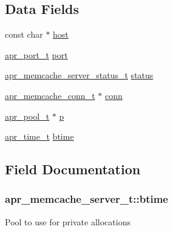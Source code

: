\subsection*{Data Fields}
\begin{DoxyCompactItemize}
\item 
const char $\ast$ \hyperlink{structapr__memcache__server__t_a3f0cbe5cde09d28791f8a8950258b305}{host}
\item 
\hyperlink{group__apr__network__io_gaa670a71960f6eb4fe0d0de2a1e7aba03}{apr\+\_\+port\+\_\+t} \hyperlink{structapr__memcache__server__t_aade2ee234b229b6711a80fe2a3de853b}{port}
\item 
\hyperlink{group__APR__Util__MC_ga3b18c7c3f0ecabb930b78aa549c2e2e8}{apr\+\_\+memcache\+\_\+server\+\_\+status\+\_\+t} \hyperlink{structapr__memcache__server__t_a641c9cd95499a998ba2717ec5f03b174}{status}
\item 
\hyperlink{structapr__memcache__conn__t}{apr\+\_\+memcache\+\_\+conn\+\_\+t} $\ast$ \hyperlink{structapr__memcache__server__t_ada8c44030313b85cfd00d3abddc5f8f6}{conn}
\item 
\hyperlink{structapr__pool__t}{apr\+\_\+pool\+\_\+t} $\ast$ \hyperlink{structapr__memcache__server__t_a2acd73a302db659fb888889837ce4fc3}{p}
\item 
\hyperlink{group__apr__time_gadb4bde16055748190eae190c55aa02bb}{apr\+\_\+time\+\_\+t} \hyperlink{structapr__memcache__server__t_a5f7fede39227399f9af9a0d19c9ba8c0}{btime}
\end{DoxyCompactItemize}


\subsection{Field Documentation}
\subsubsection[{\texorpdfstring{btime}{btime}}]{ apr\+\_\+memcache\+\_\+server\+\_\+t\+::btime}\hypertarget{structapr__memcache__server__t_a5f7fede39227399f9af9a0d19c9ba8c0}{}\label{structapr__memcache__server__t_a5f7fede39227399f9af9a0d19c9ba8c0}
Pool to use for private allocations 
